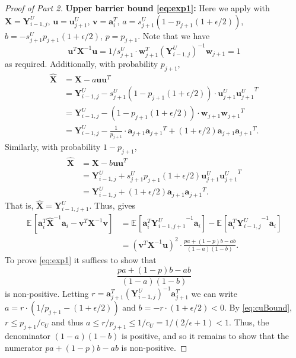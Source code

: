 \documentclass{toc}
\newcommand{\bv}[1]{\mathbf{#1}}
\newcommand{\expct}[3]{\mathbb{E}_{{#1}_{#2}}\left[#3\right]}
\begin{document}
\begin{proof}[Proof of  Part 2]
\smallskip

\noindent \textbf{Upper barrier bound \eqref{eq:exp1}:} Here we apply  with $\bv{X} = \bv{Y}^U_{i-1,j}$, $\bv{u} = \bv{u}^U_{j+1}$, $\bv{v} = \bv{a}_i^T$, $a = s^U_{j+1} (1 - p_{j+1} (1 + \epsilon / 2))$, $b = -s^U_{j+1} p_{j+1} (1 + \epsilon / 2)$, $p = p_{j+1}$. Note that we have
\[
  \bv{u}^T \bv{X}^{-1} \bv{u} = 1/s^U_{j+1} \cdot \bv{w}_{j+1}^T (\bv{Y}^U_{i-1,j})^{-1}  \bv{w}_{j+1} = 1
\]
as required. Additionally, with probability  $p_{j+1}$,
\begin{align*}
\bv{\widehat X} &= \bv{X} - a \bv{uu}^T\\ 
&=  \bv{Y}^U_{i-1,j} - s^U_{j+1} (1 - p_{j+1} (1 + \epsilon / 2)) \cdot \bv{u}_{j+1}^U {\bv{u}_{j+1}^U }^T\\
&=  \bv{Y}^U_{i-1,j} - (1 - p_{j+1} (1 + \epsilon / 2)) \cdot \bv{w}_{j+1} {\bv{w}_{j+1}}^T\\
&=  \bv{Y}^U_{i-1,j} - \frac{1}{p_{j+1}} \cdot \bv{a}_{j+1} {\bv{a}_{j+1}}^T + (1 + \epsilon / 2) \bv{a}_{j+1} {\bv{a}_{j+1}}^T.
\end{align*}
Similarly, with probability $1-p_{j+1}$,
\begin{align*}
\bv{\widehat X} &= \bv{X} - b \bv{uu}^T\\ 
&=   \bv{Y}^U_{i-1,j}  + s^U_{j+1} p_{j+1} (1 + \epsilon / 2) \bv{u}_{j+1}^U {\bv{u}_{j+1}^U }^T\\
& = \bv{Y}^U_{i-1,j} + (1 + \epsilon / 2) \bv{a}_{j+1} {\bv{a}_{j+1}}^T.
\end{align*}
That is, $\bv{\widehat X} = \bv{Y}^U_{i-1,j+1}$.  Thus,  gives
\begin{align*}
\expct{}{}{\bv{a}_i^T \bv{\widehat X}^{-1} \bv{a}_i - \bv{v}^T \bv{X}^{-1} \bv{v}}  &= \expct{}{}{\bv{a}_i^T {\bv{Y}^U_{i-1,j+1}}^{-1} \bv{a}_i} - \expct{}{}{\bv{a}_i^T {\bv{Y}^U_{i-1,j}}^{-1}  \bv{a}_i}\\
&= (\bv{v}^T \bv{X}^{-1} \bv{u})^2 \cdot \frac{pa + (1-p)b - ab}{(1-a)(1-b)}.
\end{align*}
To prove \eqref{eq:exp1} it suffices to show that
%
\[
  \frac{pa + (1-p)b - ab}{(1-a)(1-b)}
\]
is non-positive.  Letting
$r = \bv{a}_{j+1}^T (\bv{Y}^U_{i-1,j})^{-1} \bv{a}_{j+1}^T$ we can
write $a = r \cdot \left (1/p_{j+1} - (1+\epsilon/2) \right )$ and
$b = -r \cdot (1+\epsilon/2) < 0$. By \eqref{eq:cuBound},
$r \le p_{j+1}/{c_U}$ and thus
$a \le r/p_{j+1} \le 1/c_U = 1/(2/\epsilon + 1) < 1$. Thus, the
denominator $(1-a)(1-b)$ is positive, and so it remains to show that
the numerator $pa + (1-p)b - ab$ is non-positive. 

\end{proof}
\end{document}
